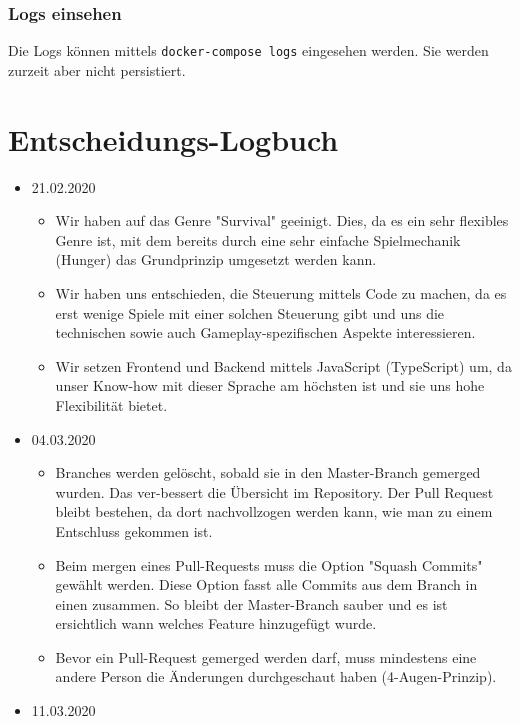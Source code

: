 \documentclass[11pt,a4paper,german]{scrartcl}
\let\oldsection\section
\renewcommand\section{\clearpage\oldsection}
\begin{document}
\subsubsection{Logs einsehen}
Die Logs können mittels \texttt{docker-compose logs} eingesehen werden. Sie werden zurzeit aber nicht persistiert.

\section{Entscheidungs-Logbuch}

\begin{itemize}
  \item 21.02.2020
        \begin{itemize}
          \item Wir haben auf das Genre "Survival" geeinigt. Dies, da es ein sehr flexibles Genre ist, mit dem bereits durch eine sehr einfache Spielmechanik (Hunger) das Grundprinzip umgesetzt werden kann.
          \item Wir haben uns entschieden, die Steuerung mittels Code zu machen, da es erst wenige Spiele mit einer solchen Steuerung gibt und uns die technischen sowie auch Gameplay-spezifischen Aspekte interessieren.
          \item Wir setzen Frontend und Backend mittels JavaScript (TypeScript) um, da unser Know-how mit dieser Sprache am höchsten ist und sie uns hohe Flexibilität bietet.
        \end{itemize}
  \item 04.03.2020
        \begin{itemize}
          \item Branches werden gelöscht, sobald sie in den Master-Branch gemerged wurden. Das ver-bessert die Übersicht im Repository. Der Pull Request bleibt bestehen, da dort nachvollzogen werden kann, wie man zu einem Entschluss gekommen ist.
          \item Beim mergen eines Pull-Requests muss die Option "Squash Commits" gewählt werden. Diese Option fasst alle Commits aus dem Branch in einen zusammen. So bleibt der Master-Branch sauber und es ist ersichtlich wann welches Feature hinzugefügt wurde.
          \item Bevor ein Pull-Request gemerged werden darf, muss mindestens eine andere Person die Änderungen durchgeschaut haben (4-Augen-Prinzip).
        \end{itemize}
  \item 11.03.2020
        \begin{itemize}

\end{itemize}
\end{itemize}
\end{document}
